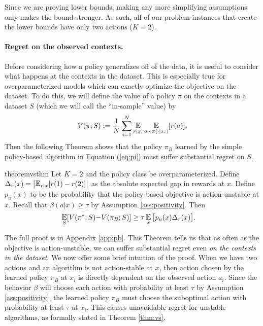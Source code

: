Since we are proving lower bounds, making any more simplifying assumptions only makes the bound stronger. As such, all of our problem instances that create the lower bounds have only two actions ($ K = 2$).

\paragraph{Regret on the observed contexts.} Before considering how a policy generalizes off of the data, it is useful to consider what happens at the contexts in the dataset. This is especially true for overparameterized models which can exactly optimize the objective on the dataset. To do this, we will define the value of a policy $ \pi$ on the contexts in a dataset $ S $ (which we will call the ``in-sample'' value) by
\begin{align}
    V(\pi; S) := \frac{1}{N}\sum_{i=1}^N \E_{r|x_i}\E_{a\sim \pi(\cdot|x_i)}[r(a)].
\end{align}
Then the following Theorem shows that the policy $\pi_B$ learned by the simple policy-based algorithm in Equation (\ref{eq:pi}) must suffer substantial regret on $S$.

\begin{restatable}{theorem}{vsthm}\label{thm:vs}
Let $ K=2$ and the policy class be overparameterized.
Define $ \Delta_r(x) = \left|\E_{r|x} [r(1) - r(2)]\right|$ as the absolute expected gap in rewards at $ x$.
Define $p_u(x)$ to be the probability that the policy-based objective is action-unstable at $ x$. Recall that $ \beta(a|x) \geq \tau$ by Assumption \ref{ass:positivity}.
Then
\begin{align*}
    \E_S[V(\pi^*;S) - &V(\pi_B; S)] \geq  \tau \E_{x}\big[ p_u(x) \Delta_r(x)\big].  %
\end{align*}
\end{restatable}

The full proof is in Appendix \ref{app:pb}.
This Theorem tells us that as often as the objective is action-unstable, we can suffer substantial regret even \emph{on the contexts in the dataset}. We now offer some brief intuition of the proof. When we have two actions and an algorithm is not action-stable at $ x $, then action chosen by the learned policy $ \pi_B$ at $ x_i$ is directly dependent on the observed action $ a_i$. Since the behavior $ \beta$ will choose each action with probability at least $ \tau$ by Assumption \ref{ass:positivity}, the learned policy $ \pi_B$ must choose the suboptimal action with probability at least $ \tau$ at $ x_i$. This causes unavoidable regret for unstable algorithms, as formally stated in Theorem \ref{thm:vs}.

